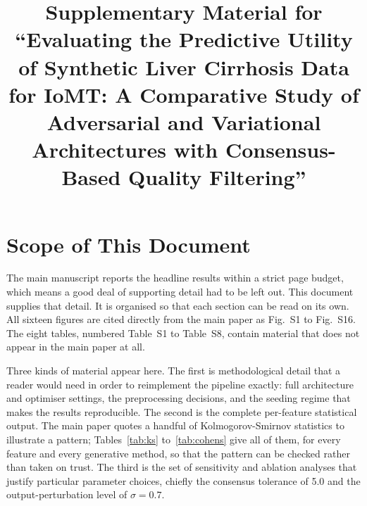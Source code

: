 \documentclass[journal,onecolumn]{IEEEtran}
\begin{document}
\title{Supplementary Material for\\
``Evaluating the Predictive Utility of Synthetic Liver Cirrhosis Data for IoMT: A Comparative Study of Adversarial and Variational Architectures with Consensus-Based Quality Filtering''}

\author{
}

\maketitle

\section{Scope of This Document}

The main manuscript reports the headline results within a strict page budget, which means a good deal of supporting detail had to be left out. This document supplies that detail. It is organised so that each section can be read on its own. All sixteen figures are cited directly from the main paper as Fig.~S1 to Fig.~S16. The eight tables, numbered Table~S1 to Table~S8, contain material that does not appear in the main paper at all.

Three kinds of material appear here. The first is methodological detail that a reader would need in order to reimplement the pipeline exactly: full architecture and optimiser settings, the preprocessing decisions, and the seeding regime that makes the results reproducible. The second is the complete per-feature statistical output. The main paper quotes a handful of Kolmogorov-Smirnov statistics to illustrate a pattern; Tables~\ref{tab:ks} to~\ref{tab:cohens} give all of them, for every feature and every generative method, so that the pattern can be checked rather than taken on trust. The third is the set of sensitivity and ablation analyses that justify particular parameter choices, chiefly the consensus tolerance of 5.0 and the output-perturbation level of $\sigma = 0.7$.
\end{document}
